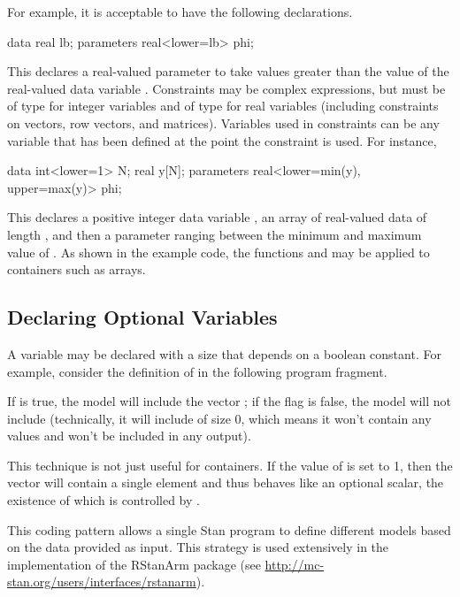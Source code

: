 For example, it is acceptable to have the
following declarations.
%
\begin{stancode}
data {
 real lb;
}
parameters {
   real<lower=lb> phi;
}
\end{stancode}
%
This declares a real-valued parameter  to take values
greater than the value of the real-valued data variable .
Constraints may be complex expressions, but must be of type 
for integer variables and of type  for real variables
(including constraints on vectors, row vectors, and matrices).
Variables used in constraints can be any variable that has been
defined at the point the constraint is used.  For instance,
\begin{stancode}
data {
   int<lower=1> N;
   real y[N];
}
parameters {
   real<lower=min(y), upper=max(y)> phi;
}
\end{stancode}
%
This declares a positive integer data variable , an array
 of real-valued data of length , and then a parameter
ranging between the minimum and maximum value of .  As shown
in the example code, the functions  and  may
be applied to containers such as arrays.

\subsection{Declaring Optional Variables}

A variable may be declared with a size that depends on a boolean
constant.  For example, consider the definition of  in the
following program fragment.
%
\begin{stancode}
data {
  int<lower = 0, upper = 1> include_alpha;
  ...
parameters {
  vector[include_alpha ? N : 0] alpha;
\end{stancode}
%
If  is true, the model will include the vector
;  if the flag is false, the model will not include
 (technically, it will include  of size 0,
which means it won't contain any values and won't be included in any
output).

This technique is not just useful for containers.  If the value of
 is set to 1, then the vector  will contain a
single element and thus  behaves like an optional
scalar, the existence of which is controlled by .

This coding pattern allows a single Stan program to define different
models based on the data provided as input.  This strategy is used
extensively in the implementation of the RStanArm package (see
\url{http://mc-stan.org/users/interfaces/rstanarm}).

